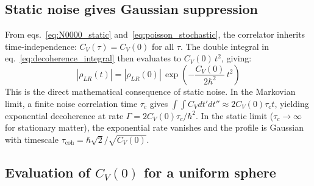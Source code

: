 \documentclass[12pt,a4paper]{article}
\begin{document}
\subsection{Static noise gives Gaussian suppression}

From eqs.~\eqref{eq:N0000_static} and~\eqref{eq:poisson_stochastic}, the correlator
inherits time-independence: $C_V(\tau) = C_V(0)$ for all $\tau$. The double integral in
eq.~\eqref{eq:decoherence_integral} then evaluates to $C_V(0)\,t^2$, giving:
\begin{equation}
|\rho_{LR}(t)| = |\rho_{LR}(0)|\,\exp\!\left(-\frac{C_V(0)}{2\hbar^2}\,t^2\right)
\label{eq:gaussian_suppression}
\end{equation}
This is the direct mathematical consequence of static noise. In the Markovian limit, a
finite noise correlation time $\tau_c$ gives $\int\int C_V dt'dt'' \approx 2C_V(0)\tau_c
t$, yielding exponential decoherence at rate $\Gamma = 2C_V(0)\tau_c/\hbar^2$. In the
static limit ($\tau_c\to\infty$ for stationary matter), the exponential rate vanishes and
the profile is Gaussian with timescale $\tau_{\text{coh}} = \hbar\sqrt{2}/\sqrt{C_V(0)}$.

\subsection{Evaluation of $C_V(0)$ for a uniform sphere}
\end{document}
